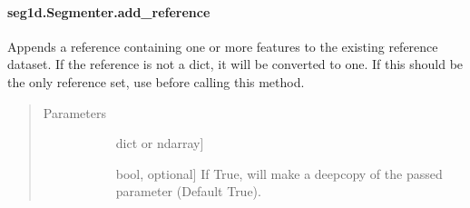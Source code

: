 \documentclass[letterpaper,10pt,english]{sphinxmanual}
\begin{document}
\paragraph{seg1d.Segmenter.add\_reference}
\label{\detokenize{generated/seg1d.Segmenter.add_reference:seg1d-segmenter-add-reference}}\label{\detokenize{generated/seg1d.Segmenter.add_reference::doc}}

\begin{fulllineitems}
\label{\detokenize{generated/seg1d.Segmenter.add_reference:seg1d.Segmenter.add_reference}}
\sphinxAtStartPar
Appends a reference containing one or more features to the existing
reference dataset.
If the reference is not a dict, it will be converted to one.
If this should be the only reference set, use 
before calling this method.
\begin{quote}\begin{description}
\item[{Parameters}] \leavevmode\begin{description}
\item[{}] \leavevmode{[}dict or ndarray{]}

\item[{}] \leavevmode{[}bool, optional{]}
\sphinxAtStartPar
If True, will make a deepcopy of the passed parameter
(Default True).

\end{description}

\end{description}\end{quote}


\nopagebreak


\end{fulllineitems}
\end{document}
